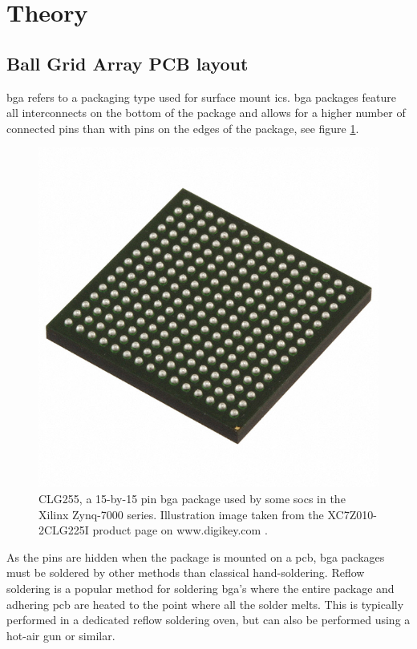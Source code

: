 \section{Theory}

\subsection{Ball Grid Array PCB layout}

\acrshort{bga} refers to a packaging type used for surface mount \acrshort{ic}s. \acrshort{bga} packages feature all interconnects on the bottom of the package and allows for a higher number of connected pins than with pins on the edges of the package, see figure \ref{fig:clg255}.

\begin{figure}[H]
    \centering
    \includegraphics[width=.75\textwidth]{media/CLG225.JPG}
    \caption{CLG255, a 15-by-15 pin \acrshort{bga} package used by some \acrshort{soc}s in the Xilinx Zynq-7000 series. Illustration image taken from the XC7Z010-2CLG225I product page on www.digikey.com \cite{clg225}.}
    \label{fig:clg255}
\end{figure}

As the pins are hidden when the package is mounted on a \acrshort{pcb}, \acrshort{bga} packages must be soldered by other methods than classical hand-soldering. Reflow soldering is a popular method for soldering \acrshort{bga}'s where the entire package and adhering \acrshort{pcb} are heated to the point where all the solder melts. This is typically performed in a dedicated reflow soldering oven, but can also be performed using a hot-air gun or similar.


